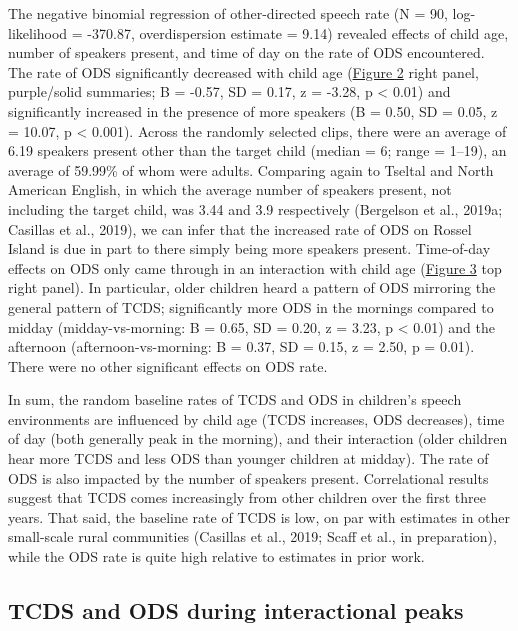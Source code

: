 \documentclass[,man,floatsintext]{apa6}
\begin{document}
The negative binomial regression of other-directed speech rate (N = 90,
log-likelihood = -370.87, overdispersion estimate = 9.14) revealed
effects of child age, number of speakers present, and time of day on the
rate of ODS encountered. The rate of ODS significantly decreased with
child age (\protect\hyperlink{fig2}{Figure 2} right panel, purple/solid
summaries; B = -0.57, SD = 0.17, z = -3.28, p \textless{} 0.01) and
significantly increased in the presence of more speakers (B = 0.50, SD =
0.05, z = 10.07, p \textless{} 0.001). Across the randomly selected
clips, there were an average of 6.19 speakers present other than the
target child (median = 6; range = 1--19), an average of 59.99\% of whom
were adults. Comparing again to Tseltal and North American English, in
which the average number of speakers present, not including the target
child, was 3.44 and 3.9 respectively (Bergelson et al., 2019a; Casillas
et al., 2019), we can infer that the increased rate of ODS on Rossel
Island is due in part to there simply being more speakers present.
Time-of-day effects on ODS only came through in an interaction with
child age (\protect\hyperlink{fig3}{Figure 3} top right panel). In
particular, older children heard a pattern of ODS mirroring the general
pattern of TCDS; significantly more ODS in the mornings compared to
midday (midday-vs-morning: B = 0.65, SD = 0.20, z = 3.23, p \textless{}
0.01) and the afternoon (afternoon-vs-morning: B = 0.37, SD = 0.15, z =
2.50, p = 0.01). There were no other significant effects on ODS rate.

In sum, the random baseline rates of TCDS and ODS in children's speech
environments are influenced by child age (TCDS increases, ODS
decreases), time of day (both generally peak in the morning), and their
interaction (older children hear more TCDS and less ODS than younger
children at midday). The rate of ODS is also impacted by the number of
speakers present. Correlational results suggest that TCDS comes
increasingly from other children over the first three years. That said,
the baseline rate of TCDS is low, on par with estimates in other
small-scale rural communities (Casillas et al., 2019; Scaff et al., in
preparation), while the ODS rate is quite high relative to estimates in
prior work.

\subsection{TCDS and ODS during interactional
peaks}\label{tcds-and-ods-during-interactional-peaks}
\end{document}
